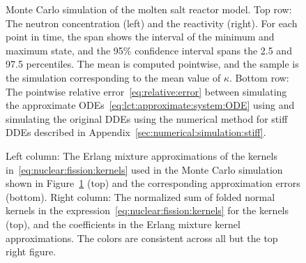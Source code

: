 \begin{figure}
	\centering
	\caption{Monte Carlo simulation of the molten salt reactor model. Top row: The neutron concentration (left) and the reactivity (right). For each point in time, the span shows the interval of the minimum and maximum state, and the 95\% confidence interval spans the 2.5 and 97.5 percentiles. The mean is computed pointwise, and the sample is the simulation corresponding to the mean value of $\kappa$. Bottom row: The pointwise relative error~\eqref{eq:relative:error} between simulating the approximate ODEs~\eqref{eq:lct:approximate:system:ODE} using \odeofs{} and simulating the original DDEs using the numerical method for stiff DDEs described in Appendix~\ref{sec:numerical:simulation:stiff}.}
	\label{fig:nuclear:fission:monte:carlo:simulation:parameters}
\end{figure}

\begin{figure}
	\caption{Left column: The Erlang mixture approximations of the kernels in~\eqref{eq:nuclear:fission:kernels} used in the Monte Carlo simulation shown in Figure~\ref{fig:nuclear:fission:monte:carlo:simulation:parameters} (top) and the corresponding approximation errors (bottom). Right column: The normalized sum of folded normal kernels in the expression~\eqref{eq:nuclear:fission:kernels} for the kernels (top), and the coefficients in the Erlang mixture kernel approximations. The colors are consistent across all but the top right figure.}
	\label{fig:nuclear:fission:identified:kernels}
\end{figure}

